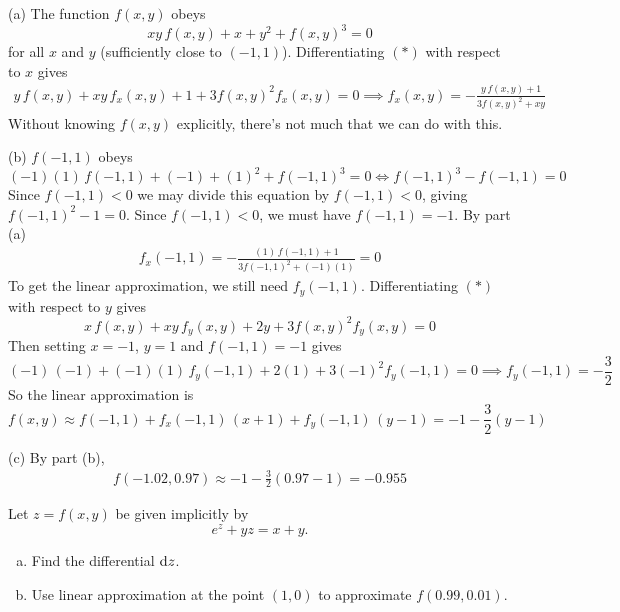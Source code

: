\begin{solution}
(a) The function $f(x,y)$ obeys
\begin{equation*}
xy\,f(x,y) + x + y^2 + f(x,y)^3 =0
\tag{$*$}\end{equation*} 
for all $x$ and $y$ (sufficiently close to $(-1,1)$). 
Differentiating $(*)$ with respect to $x$ gives
\begin{align*}
y\,f(x,y) +xy\,f_x(x,y) +  1  + 3f(x,y)^2 f_x(x,y) = 0
\implies
f_x(x,y) = -\frac{y\,f(x,y) +1}{3f(x,y)^2 +xy}
\end{align*}
Without knowing $f(x,y)$ explicitly, there's not much that we can do with this.

(b) $f(-1,1)$ obeys
\begin{equation*}
(-1)(1)\,f(-1,1) + (-1) + (1)^2 + f(-1,1)^3 =0
\iff f(-1,1)^3 -f(-1,1) =0
\end{equation*}
Since $f(-1, 1) < 0$ we may divide this equation by $f(-1, 1) < 0$,
giving $f(-1,1)^2 - 1=0$. Since $f(-1, 1) < 0$, we must have $f(-1, 1)=-1$.
By part (a) 
\begin{align*}
f_x(-1, 1) = -\frac{(1)\,f(-1, 1) +1}{3f(-1, 1)^2 +(-1)(1)}
           = 0
\end{align*}
To get the linear approximation, we still need $f_y(-1,1)$.
Differentiating $(*)$ with respect to $y$ gives
\begin{equation*}
x\,f(x,y) + xy\,f_y(x,y)  + 2y + 3f(x,y)^2 f_y(x,y) =0
\end{equation*} 
Then setting $x=-1$, $y=1$ and $f(-1,1)=-1$ gives
\begin{equation*}
(-1)\,(-1) + (-1)(1)\,f_y(-1,1)  + 2(1) + 3(-1)^2 f_y(-1,1) =0
\implies f_y(-1,1) =-\frac{3}{2}
\end{equation*} 
So the linear approximation is
\begin{equation*}
f(x,y) \approx f(-1,1) + f_x(-1,1)\,(x+1) + f_y(-1,1)\,(y-1)
           = -1 -\frac{3}{2} (y-1)
\end{equation*}

(c) By part (b),
\begin{align*}
f(-1.02,0.97) \approx  -1 -\frac{3}{2} (0.97-1) =-0.955
\end{align*}
\end{solution}

\begin{question}[M200 2014D] %
Let $z = f(x,y)$ be given implicitly by
\begin{equation*}
  e^z + yz = x + y.
\end{equation*}

\begin{enumerate}[(a)]
\item
Find the differential $\mathrm{d}z$.
\item
Use linear approximation at the point $(1,0)$ to approximate $f(0.99,0.01)$.
\end{enumerate}
\end{question}

